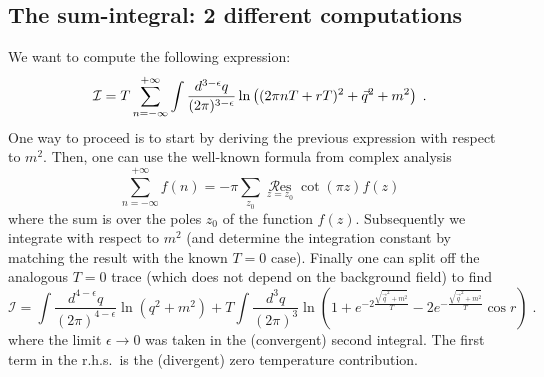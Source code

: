 \subsection{The sum-integral: 2 different computations}
We want to compute the following expression:
\begin{equation}
\mathcal{I }= T \sum_{n=-\infty}^{+\infty}\int\frac{ d^{3-\epsilon}q}{%
(2\pi)^{3-\epsilon}} \ln \left((2\pi nT + rT)^2+\vec{q}^2+m^2\right) \;.
\end{equation}
One way to proceed is to start by deriving the previous expression with
respect to $m^2$. Then, one can use the well-known formula from complex
analysis
\begin{equation}  \label{3}
\sum_{n=-\infty}^{+\infty} f(n) = -\pi\sum_{z_0}\mathop{\mathcal Res}%
\limits_{z=z_0}\cot(\pi z)f(z)
\end{equation}
where the sum is over the poles $z_0$ of the function $f(z)$. Subsequently
we integrate with respect to $m^2$ (and determine the integration
constant by matching the result with the known $T=0$ case). Finally one can split off the analogous $T=0$ trace (which does not depend on the background
field) to find
\begin{equation}  \label{6}
\mathcal{I }= \int \frac{d^{4-\epsilon}q}{(2\pi)^{4-\epsilon}}\ln(q^2+m^2) +
T \int\frac{d^{3}q}{(2\pi)^{3}}\ln\left(1+e^{-2\frac{\sqrt{\vec{q}^2+m^2}}{T}%
}-2e^{-\frac{\sqrt{\vec{q}^2+m^2}}{T}}\cos r\right) \;.
\end{equation}
where the limit $\epsilon\to0$ was taken in the (convergent) second
integral. The first term in the r.h.s.~is the (divergent) zero temperature
contribution.

